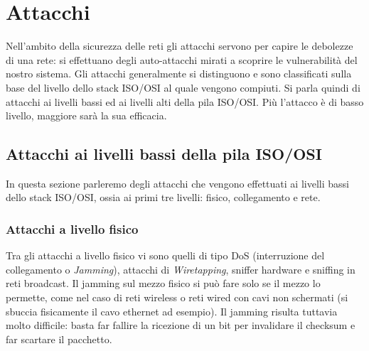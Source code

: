 \chapter{Attacchi}
Nell'ambito della sicurezza delle reti gli attacchi servono per capire le debolezze di una rete: si effettuano degli auto-attacchi mirati a scoprire le vulnerabilità del nostro sistema. Gli attacchi generalmente si distinguono e sono classificati sulla base del livello dello stack ISO/OSI al quale vengono compiuti. Si parla quindi di attacchi ai livelli bassi ed ai livelli alti della pila ISO/OSI. Più l'attacco è di basso livello, maggiore sarà la sua efficacia.

\section{Attacchi ai livelli bassi della pila ISO/OSI}
In questa sezione parleremo degli attacchi che vengono effettuati ai livelli bassi dello stack ISO/OSI, ossia ai primi tre livelli: fisico, collegamento e rete.

\subsection{Attacchi a livello fisico}
Tra gli attacchi a livello fisico vi sono quelli di tipo DoS (interruzione del collegamento o \textit{Jamming}), attacchi di \textit{Wiretapping}, sniffer hardware e sniffing in reti broadcast. Il jamming sul mezzo fisico si può fare solo se il mezzo lo permette, come nel caso di reti wireless o reti wired con cavi non schermati (si sbuccia fisicamente il cavo ethernet ad esempio). Il jamming risulta tuttavia molto difficile: basta far fallire la ricezione di un bit per invalidare il checksum e far scartare il pacchetto.

